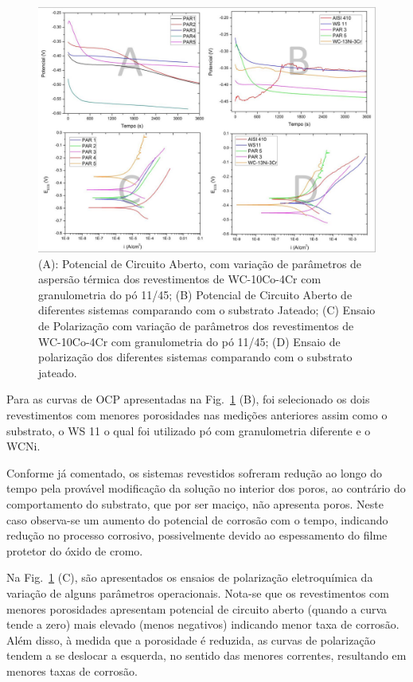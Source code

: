 \begin{figure}
	\centering
	\includegraphics[width=1\columnwidth]{method/figs/adequacao/adequacao4.png}
    \caption{(A): Potencial de Circuito Aberto, com variação de parâmetros de
    aspersão térmica dos revestimentos de WC-10Co-4Cr com granulometria do pó
    11/45; (B) Potencial de Circuito Aberto de diferentes sistemas comparando
    com o substrato Jateado; (C) Ensaio de Polarização com variação de
    parâmetros dos revestimentos de WC-10Co-4Cr com granulometria do pó 11/45;
    (D) Ensaio de polarização dos diferentes sistemas comparando com o
    substrato jateado.}
    \label{fig:adequacao4}
\end{figure}

Para as curvas de OCP apresentadas na Fig.~\ref{fig:adequacao4} (B), foi
selecionado os dois revestimentos com menores porosidades nas medições anteriores assim como o
substrato, o WS 11 o qual foi utilizado pó com granulometria diferente e o WCNi.

Conforme já comentado, os sistemas revestidos sofreram redução ao longo do tempo
pela provável modificação da solução no interior dos poros, ao contrário do
comportamento do substrato, que por ser maciço, não apresenta poros. Neste caso
observa-se um aumento do potencial de corrosão com o tempo, indicando redução no
processo corrosivo, possivelmente devido ao espessamento do filme protetor do
óxido de cromo.

Na Fig.~\ref{fig:adequacao4} (C), são apresentados os ensaios de polarização
eletroquímica da variação de alguns parâmetros operacionais. Nota-se que os
revestimentos com menores porosidades apresentam potencial de circuito aberto
(quando a curva tende a zero) mais elevado (menos negativos) indicando menor
taxa de corrosão. Além disso, à medida que a porosidade é reduzida, as curvas de
polarização tendem a se deslocar a esquerda, no sentido das menores correntes,
resultando em menores taxas de corrosão.

